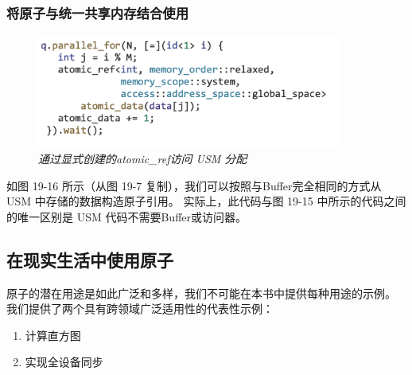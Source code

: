\subsubsection{将原子与统一共享内存结合使用}
\begin{figure}[H]
	\centering
	\includegraphics[width=0.9\textwidth]{figs/F19.16.png}
	\caption{\textit{通过显式创建的atomic\_ref访问 USM 分配 }}
\end{figure}

如图 19-16 所示（从图 19-7 复制），我们可以按照与Buffer完全相同的方式从 USM 中存储的数据构造原子引用。 
实际上，此代码与图 19-15 中所示的代码之间的唯一区别是 USM 代码不需要Buffer或访问器。

\subsection{在现实生活中使用原子}
原子的潜在用途是如此广泛和多样，我们不可能在本书中提供每种用途的示例。 
我们提供了两个具有跨领域广泛适用性的代表性示例：

\begin{enumerate}
	\item 计算直方图

	\item 实现全设备同步
\end{enumerate}

